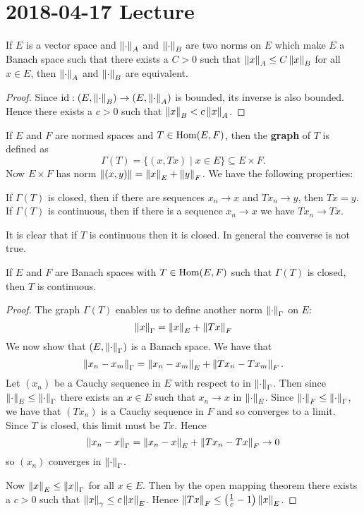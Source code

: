 \section{2018-04-17 Lecture}

\begin{cor}
	If $E$ is a vector space and $\left\lVert \cdot \right\rVert_A$ and $\left\lVert \cdot \right\rVert_B$ are two norms on $E$ which make $E$ a Banach space such that there exists a $C>0$ such that $\left\lVert x \right\rVert_A\leq C\left\lVert x \right\rVert_B$ for all $x \in E$, then $\left\lVert \cdot \right\rVert_A$ and $\left\lVert \cdot \right\rVert_B$ are equivalent.
\end{cor}

\begin{proof}
	Since $\operatorname{id}: (E,\left\lVert \cdot \right\rVert_B) \to (E,\left\lVert \cdot \right\rVert_A)$ is bounded, its inverse is also bounded.
	Hence there exists a $c>0$ such that $\left\lVert x \right\rVert_B<c\left\lVert x \right\rVert_A$.
\end{proof}

\begin{defn}
	If $E$ and $F$ are normed spaces and $T \in \operatorname{Hom}(E,F)$, then the \textbf{graph} of $T$ is defined as
	\[\Gamma(T) = \{(x,Tx) \mid x \in E\} \subseteq E \times F.\]
	Now $E \times F$ has norm $\left\lVert (x,y) \right\rVert=\left\lVert x \right\rVert_E+\left\lVert y \right\rVert_F$.
	We have the following properties:
	\begin{enum}
		\io If $\Gamma(T)$ is closed, then if there are sequences $x_n \to x$ and $Tx_n \to y$, then $Tx=y$.
		\io If $\Gamma(T)$ is continuous, then if there is a sequence $x_n \to x$ we have $Tx_n \to Tx$.
	\end{enum}
	It is clear that if $T$ is continuous then it is closed.
	In general the converse is not true.
\end{defn}

\begin{thm}
	If $E$ and $F$ are Banach spaces with $T \in \operatorname{Hom}(E,F)$ such that $\Gamma(T)$ is closed, then $T$ is continuous.
\end{thm}

\begin{proof}
	The graph $\Gamma(T)$ enables us to define another norm $\left\lVert \cdot \right\rVert_\Gamma$ on $E$:
	\[\left\lVert x \right\rVert_\Gamma = \left\lVert x \right\rVert_E + \left\lVert Tx \right\rVert_F\]
	We now show that $(E,\left\lVert \cdot \right\rVert_\Gamma)$ is a Banach space.
	We have that
	\[\left\lVert x_n-x_m \right\rVert_\Gamma = \left\lVert x_n-x_m \right\rVert_E + \left\lVert Tx_n-Tx_m \right\rVert_F.\]
	Let $(x_n)$ be a Cauchy sequence in $E$ with respect to in $\left\lVert \cdot \right\rVert_\Gamma$.
	Then since $\left\lVert \cdot \right\rVert_E \leq \left\lVert \cdot \right\rVert_\Gamma$ there exists an $x \in E$ such that $x_n \to x$ in $\left\lVert \cdot \right\rVert_E$.
	Since $\left\lVert \cdot \right\rVert_F \leq \left\lVert \cdot \right\rVert_\Gamma$, we have that $(Tx_n)$ is a Cauchy sequence in $F$ and so converges to a limit.
	Since $T$ is closed, this limit must be $Tx$.
	Hence
	\[\left\lVert x_n-x \right\rVert_\Gamma = \left\lVert x_n-x \right\rVert_E + \left\lVert Tx_n-Tx \right\rVert_F \to 0\]
	so $(x_n)$ converges in $\left\lVert \cdot \right\rVert_\Gamma$.
		
	Now $\left\lVert x \right\rVert_E \leq \left\lVert x \right\rVert_\Gamma$ for all $x \in E$.
	Then by the open mapping theorem there exists a $c>0$ such that $\left\lVert x \right\rVert_\gamma \leq c\left\lVert x \right\rVert_E$.
	Hence $\left\lVert Tx \right\rVert_F \leq \left(\frac 1c-1\right)\left\lVert x \right\rVert_E$.
\end{proof}

